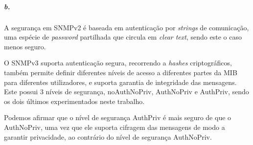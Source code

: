 \begin{itemize}
\end{itemize}

\newpage

\subparagraph{b.}
A segurança em SNMPv2 é baseada em autenticação por \emph{strings} de comunicação, uma espécie de \emph{password} partilhada que circula em \emph{clear text}, sendo este o caso menos seguro.

O SNMPv3 suporta autenticação segura, recorrendo a \emph{hashes} criptográficos, também permite definir diferentes níveis de acesso a diferentes partes da MIB para diferentes utilizadores, e suporta garantia de integridade das mensagens.
Este possui 3 níveis de segurança, \textsf{noAuthNoPriv}, \textsf{AuthNoPriv} e \textsf{AuthPriv}, sendo os dois últimos experimentados neste trabalho.

Podemos afirmar que o nível de segurança \textsf{AuthPriv} é mais seguro de que o \textsf{AuthNoPriv}, uma vez que ele suporta cifragem das mensagens de modo a garantir privacidade, ao contrário do nível de segurança \textsf{AuthNoPriv}.